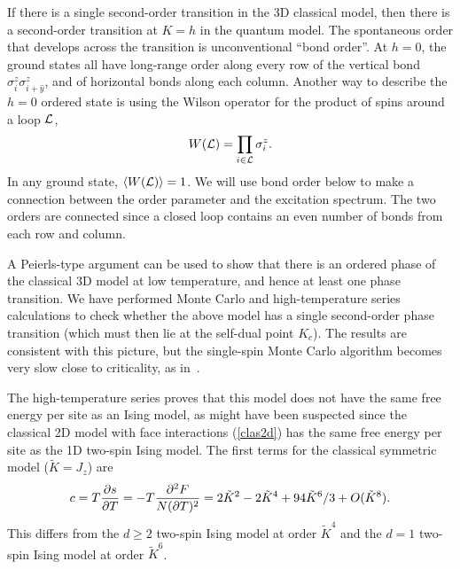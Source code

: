 \documentclass[prl,twocolumn,showpacs,superscriptaddress,preprintnumbers,amssymb]{revtex4}
\newcommand{\beq}{\begin{equation}}
\newcommand{\eeq}{\end{equation}}
\begin{document}

If there is a single second-order transition in the 3D classical model, then there is a second-order transition at $K=h$ in the quantum model.  The spontaneous order that develops across the transition is unconventional ``bond order''.  At $h=0$, the ground states all have long-range order along every row of the
vertical bond $\sigma^z_i \sigma^z_{i+{\hat y}}$, and of horizontal bonds along each column.  Another way to describe the $h=0$ ordered state is using the Wilson operator for the
product of spins around a loop ${\cal L}$, \beq W({\cal L}) =
\prod_{i \in {\cal L}} \sigma^z_i. \eeq In any ground state,
$\langle W({\cal L}) \rangle = 1$.  We will use bond order below
to make a connection between the order parameter and
the excitation spectrum.  The two orders are connected
since a closed loop contains an even number
of bonds from each row and column.


A Peierls-type argument can be used to show that there is an ordered
phase of the classical 3D model at low temperature, and
hence at least one phase transition.  We have performed
Monte Carlo and high-temperature series calculations to
check whether the above model has a single second-order
phase transition (which must then lie at the self-dual point $K_c$).  The results are consistent with this picture, but the single-spin Monte Carlo algorithm
becomes very slow close to criticality, as in~\cite{chamonunpub}.

The high-temperature series proves that this model
does not have the same free energy per site as an Ising model, as
might have been suspected since the classical 2D model with face
interactions (\ref{clas2d}) has the same free energy per site as the 1D two-spin Ising
model. The first terms for the classical symmetric model
(${\tilde K} = J_z$) are
\beq c = T {\partial s \over \partial T}
= -T{\partial^2 F \over N (\partial T)^2} = 2 {\tilde K}^2 - 2
{\tilde K}^4 + 94 {\tilde K}^6/3 + O({\tilde K}^8). \eeq
This
differs from the $d \geq 2$ two-spin Ising model at order ${\tilde
K}^4$ and the $d=1$ two-spin Ising model at order ${\tilde K}^6$.
\end{document}
